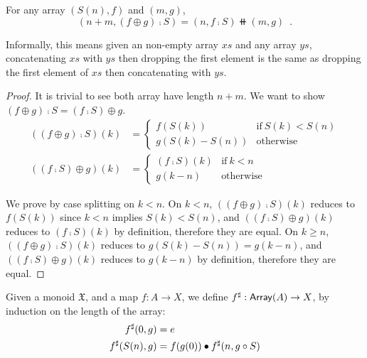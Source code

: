 \begin{lemmarep}\label{array:split}
    For any array $(S(n), f)$ and $(m, g)$,
    \[
        (n + m, (f \oplus g) \comp S) = (n, f \comp S) \doubleplus (m, g)
        \enspace .
    \]
\end{lemmarep}

Informally, this means given an non-empty array $xs$ and any array $ys$,
concatenating $xs$ with $ys$ then dropping the first element is the same as
dropping the first element of $xs$ then concatenating with $ys$.

\begin{proof}
    It is trivial to see both array have length $n + m$. We want to show $(f \oplus g) \comp S = (f \comp S) \oplus g$.
    \begin{align*}
        ((f \oplus g) \comp S)(k) & = \begin{cases}
                                          f(S(k))        & \text{if}\ S(k) < S(n) \\
                                          g(S(k) - S(n)) & \text{otherwise}
                                      \end{cases} \\
        ((f \comp S) \oplus g)(k) & = \begin{cases}
                                          (f \comp S)(k) & \text{if}\ k < n \\
                                          g(k - n)       & \text{otherwise}
                                      \end{cases}
    \end{align*}

    We prove by case splitting on $k < n$.
    On $k < n$, $((f \oplus g) \comp S)(k)$ reduces to $f(S(k))$ since $k < n$ implies $S(k) < S(n)$,
    and $((f \comp S) \oplus g)(k)$ reduces to $(f \comp S)(k)$ by definition, therefore they are equal.
    On $k \geq n$, $((f \oplus g) \comp S)(k)$ reduces to $g(S(k) - S(n)) = g(k - n)$,
    and $((f \comp S) \oplus g)(k)$ reduces to $g(k - n)$ by definition, therefore they are equal.
\end{proof}

\begin{definition}
    Given a monoid $\mathfrak{X}$, and a map $f : A \to X$,
    we define ${f}^{\sharp} : \operatorname{\mathsf{Array}}(A) \to X$, by induction on the length of the array:
    \begin{align*}
        {f}^{\sharp}(0 , g)    & = e                                    \\
        {f}^{\sharp}(S(n) , g) & = f(g(0)) \mathbin{\bullet} {f}^{\sharp}(n , g \circ S)
    \end{align*}
\end{definition}

